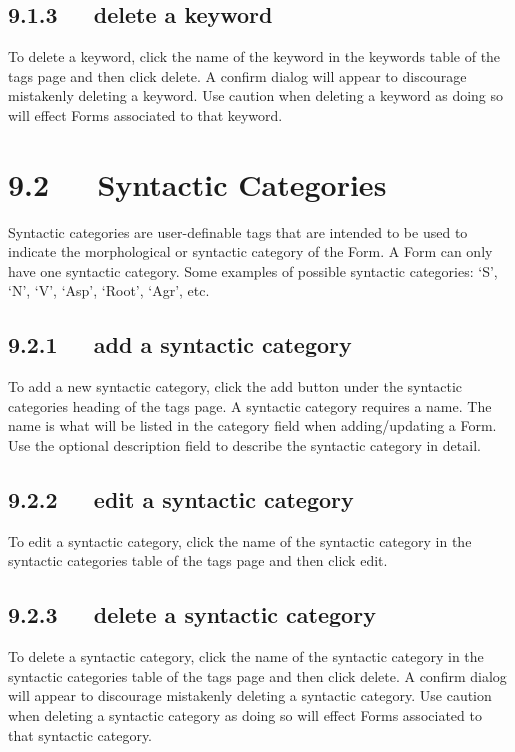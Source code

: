 \documentclass[letterpaper,10pt,english]{sphinxmanual}
\begin{document}
\subsection{9.1.3   delete a keyword}
\label{user_guide:delete-a-keyword}
To delete a keyword, click the name of the keyword in the keywords table of the
tags page and then click delete.  A confirm dialog will appear to discourage
mistakenly deleting a keyword.  Use caution when deleting a keyword as doing
so will effect Forms associated to that keyword.


\section{9.2   Syntactic Categories}
\label{user_guide:syntactic-categories}
Syntactic categories are user-definable tags that are intended to be used to
indicate the morphological or syntactic category of the Form.  A Form can only
have one syntactic category.  Some examples of possible syntactic categories:
`S', `N', `V', `Asp', `Root', `Agr', etc.


\subsection{9.2.1   add a syntactic category}
\label{user_guide:add-a-syntactic-category}
To add a new syntactic category, click the add button under the syntactic
categories heading of the tags page.  A syntactic category requires a name.  The
name is what will be listed in the category field when adding/updating a Form.
Use the optional description field to describe the syntactic category in detail.


\subsection{9.2.2   edit a syntactic category}
\label{user_guide:edit-a-syntactic-category}
To edit a syntactic category, click the name of the syntactic category in the
syntactic categories table of the tags page and then click edit.


\subsection{9.2.3   delete a syntactic category}
\label{user_guide:delete-a-syntactic-category}
To delete a syntactic category, click the name of the syntactic category in the
syntactic categories table of the tags page and then click delete.  A confirm
dialog will appear to discourage mistakenly deleting a syntactic category.  Use
caution when deleting a syntactic category as doing so will effect Forms
associated to that syntactic category.
\end{document}
